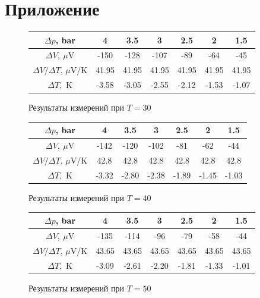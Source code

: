 \documentclass[a4paper,12pt]{report}
\begin{document}
    \section{Приложение}
    \begin{figure}[H]
        \centering
        \begin{tabular}{|c|c|c|c|c|c|c|}
            \hline
            $\Delta p$, bar & 4 & 3.5 & 3 & 2.5 & 2 & 1.5 \\
            \hline
            $\Delta V, \ \mu$V & -150 & -128 & -107 & -89 & -64 & -45 \\
            \hline
            $\Delta V/\Delta T$, $\mu\text{V}$/K & 41.95 & 41.95 & 41.95 & 41.95 & 41.95 & 41.95 \\
            \hline
            $\Delta T,$ K & -3.58 & -3.05 & -2.55 & -2.12 & -1.53 & -1.07 \\
            \hline
        \end{tabular}
        \caption{Результаты измерений при $T=30$ \celsius}
    \end{figure}
    \begin{figure}[H]
        \centering
        \begin{tabular}{|c|c|c|c|c|c|c|}
            \hline
            $\Delta p$, bar & 4 & 3.5 & 3 & 2.5 & 2 & 1.5 \\
            \hline
            $\Delta V, \ \mu$V & -142 & -120 & -102 & -81 & -62 & -44 \\
            \hline
            $\Delta V/\Delta T$, $\mu\text{V}$/K & 42.8 & 42.8 & 42.8 & 42.8 & 42.8 & 42.8 \\
            \hline
            $\Delta T,$ K & -3.32 & -2.80 & -2.38 & -1.89 & -1.45 & -1.03 \\
            \hline
        \end{tabular}
        \caption{Результаты измерений при $T=40$ \celsius}
    \end{figure}
    \begin{figure}[H]
        \centering
        \begin{tabular}{|c|c|c|c|c|c|c|}
            \hline
            $\Delta p$, bar & 4 & 3.5 & 3 & 2.5 & 2 & 1.5 \\
            \hline
            $\Delta V, \ \mu$V & -135 & -114 & -96 & -79 & -58 & -44 \\
            \hline
            $\Delta V/\Delta T$, $\mu\text{V}$/K & 43.65 & 43.65 & 43.65 & 43.65 & 43.65 & 43.65 \\
            \hline
            $\Delta T,$ K & -3.09 & -2.61 & -2.20 & -1.81 & -1.33 & -1.01 \\
            \hline
        \end{tabular}
        \caption{Результаты измерений при $T=50$ \celsius}
    \end{figure}
\end{document}
